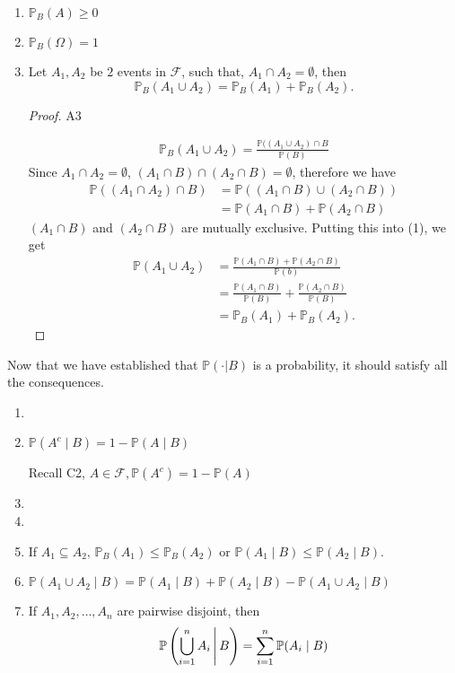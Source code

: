 \documentclass[10pt, a4paper]{article}
\begin{document}
\begin{enumerate}[label = A\arabic*]
    \item $\mathbb{P}_B(A) \geq 0$
    \item $\mathbb{P}_B(\Omega) = 1$
    \item Let $A_1, A_2$ be $2$ events in $\mathcal{F}$, such that, $A_1 \cap A_2 = \emptyset$, then
    \[
    \mathbb{P}_B(A_1 \cup A_2) = \mathbb{P}_B(A_1) + \mathbb{P}_B(A_2).
    \]
    \begin{proof}
        A3

        \begin{gather}
        \mathbb{P}_B(A_1 \cup A_2) = \frac{\mathbb{P}((A_1 \cup A_2) \cap B}{\mathbb{P}(B)}          
        \end{gather}
        Since $A_1 \cap A_2 = \emptyset$, $(A_1 \cap B) \cap (A_2 \cap B) = \emptyset$, therefore we have
        \begin{align*}
            \mathbb{P}((A_1 \cap A_2) \cap B) &= \mathbb{P}((A_1 \cap B) \cup (A_2 \cap B)) \\
            &= \mathbb{P}(A_1 \cap B) + \mathbb{P}(A_2 \cap B)
        \end{align*}
        $(A_1 \cap B)$ and $(A_2 \cap B)$ are mutually exclusive. Putting this into (1), we get
        \begin{align*}
        \mathbb{P}(A_1 \cup A_2) &= \frac{\mathbb{P}(A_1 \cap B) + \mathbb{P}(A_2 \cap B)}{\mathbb{P}(b)} \\
        &= \frac{\mathbb{P}(A_1 \cap B)}{\mathbb{P}(B)} + \frac{\mathbb{P}(A_2 \cap B)}{\mathbb{P}(B)} \\
        &= \mathbb{P}_B(A_1) + \mathbb{P}_B(A_2).
        \end{align*}
    \end{proof}
\end{enumerate}

Now that we have established that $\mathbb{P}(\cdot | B)$ is a probability, it should satisfy all the consequences.
\begin{enumerate}[label = C\arabic*]
    \item \phantom{}
    \item $\mathbb{P}(A ^ c \mid B) = 1 - \mathbb{P}(A \mid B)$

    Recall C2, $A \in \mathcal{F}, \mathbb{P}(A ^ c) = 1 - \mathbb{P}(A)$
    \item \phantom{}
    \item \phantom{}
    \item If $A_1 \subseteq A_2,\, \mathbb{P}_B(A_1) \leq \mathbb{P}_B(A_2)$ or $\mathbb{P}(A_1 \mid B) \leq \mathbb{P}(A_2 \mid B)$.
    \item $\mathbb{P}(A_1 \cup A_2 \mid B) = \mathbb{P}(A_1 \mid B) + \mathbb{P}(A_2 \mid B) - \mathbb{P}(A_1 \cup A_2 \mid B)$
    \item If $A_1, A_2,\dotsc, A_n$ are pairwise disjoint, then
    \[
    \mathbb{P}\left(\bigcup_{i = 1}^{n}A_i\,\middle|\, B\right) = \sum_{i = 1}^{n}\mathbb{P}(A_i \mid B)
    \]
\end{enumerate}
\end{document}
